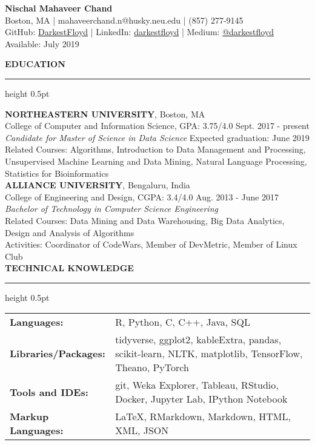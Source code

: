 \documentclass[a4paper]{article}
\newcommand{\myline}{\par
  \kern2pt %
  \hrule height 0.5pt
  \kern2pt %
}
\begin{document}
	\begin{center}
		{\Large \textbf{Nischal Mahaveer Chand}} \\
		Boston, MA | mahaveerchand.n@husky.neu.edu | (857) 277-9145 \\
                GitHub: \href{https://github.com/DarkestFloyd}{DarkestFloyd} | 
                LinkedIn: \href{https://www.linkedin.com/in/darkestfloyd}{darkestfloyd} |
								Medium: \href{https://medium.com/@darkestfloyd}{@darkestfloyd} \\
		Available: July 2019 \\
	\end{center}
	
	\noindent
	{\large \textbf{EDUCATION}}
	\myline 
	\smallskip
	
	\noindent
	\textbf{NORTHEASTERN UNIVERSITY}, Boston, MA \\
	College of Computer and Information Science, GPA: 3.75/4.0 
        \hfill Sept. 2017 - present \\
	\textit{Candidate for Master of Science in Data Science} 
        \hfill Expected graduation: June 2019 \\
        Related Courses: Algorithms, Introduction to Data Management and Processing, \\
        \hspace*{23.9mm} Unsupervised Machine Learning and Data Mining, 
        Natural Language Processing, \\
				\hspace*{23.9mm} Statistics for Bioinformatics \\
	
	\noindent
	\textbf{ALLIANCE UNIVERSITY}, Bengaluru, India \\
	College of Engineering and Design, CGPA: 3.4/4.0 \hfill Aug. 2013 - June 2017 \\
	\textit{Bachelor of Technology in Computer Science Engineering} \\
	Related Courses: 
                                    Data Mining and Data Warehousing,
                                    Big Data Analytics, 
                                    Design and Analysis of Algorithms \\
	Activities: Coordinator of CodeWars, Member of DevMetric, Member of Linux 
        Club \\
	
	\noindent
	{\large \textbf{TECHNICAL KNOWLEDGE}}
	\myline 
	
	\noindent
	\begin{tabular}{ m{3.5cm} l }
		\textbf{Languages: } & R, Python, C, C++, Java, SQL \\ 
		\textbf{Libraries/Packages: } & tidyverse, ggplot2, kableExtra, pandas, scikit-learn, NLTK, 
                 matplotlib, TensorFlow, Theano, PyTorch \\
		\textbf{Tools and IDEs: } & git, Weka Explorer, Tableau, RStudio, Docker,
                Jupyter Lab, IPython Notebook\\
		\textbf{Markup Languages: } & LaTeX, RMarkdown, Markdown, HTML, XML, JSON \\
	\end{tabular} \\
\end{document}
